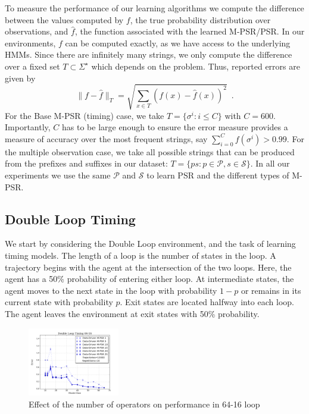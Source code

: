 \documentclass[letterpaper]{article}
\newcommand{\sstar}{\Sigma^\star}
\newcommand{\Ps}{\mathcal{P}}
\newcommand{\Ss}{\mathcal{S}}
\begin{document}

To measure the performance of our learning algorithms we compute the difference between the values computed by $f$, the true probability distribution over observations, and $\hat{f}$, the function associated with the learned M-PSR/PSR. In our environments, $f$ can be computed exactly, as we have access to the underlying HMMs. Since there are infinitely many strings, we only compute the difference over a fixed set $T \subset \sstar$ which depends on the problem. Thus, reported errors are given by
\begin{equation*}
\|f - \hat{f}\|_T = \sqrt{\sum_{x \in T}(f(x) - \hat{f}(x))^2} \enspace.
\end{equation*}
For the Base M-PSR (timing) case, we take $T = \{\sigma^i : i \leq C\}$ with $C=600$. Importantly, $C$ has to be  large enough to ensure the error measure provides a measure of accuracy over the most frequent strings, say $\sum_{i=0}^{C} f(\sigma^i)>0.99$. For the multiple observation case, we take all possible strings that can be produced from the prefixes and suffixes in our dataset: $T = \{ps : p \in \Ps, s \in \Ss\}$. In all our experiments we use the same $\Ps$ and $\Ss$ to learn PSR and the different types of M-PSR.


\subsection{Double Loop Timing}

We start by considering the Double Loop environment, and the task of learning timing models. The length of a loop is the number of states in the loop. A trajectory begins with the agent at the intersection of the two loops. Here, the agent has a 50\% probability of entering either loop. At intermediate states, the agent moves to the next state in the loop with probability $1-p$ or remains in its current state with probability $p$. Exit states are located halfway into each loop. The agent leaves the environment at exit states with 50\% probability. 


\begin{figure}[ht!]
\centering
\includegraphics[width=40mm]{NumOpsTiming.png}\vspace*{-4mm}
\caption{Effect of the number of operators on performance in 64-16 loop\label{fig-numops}\vspace*{-4mm}}
\end{figure} 
\end{document}
